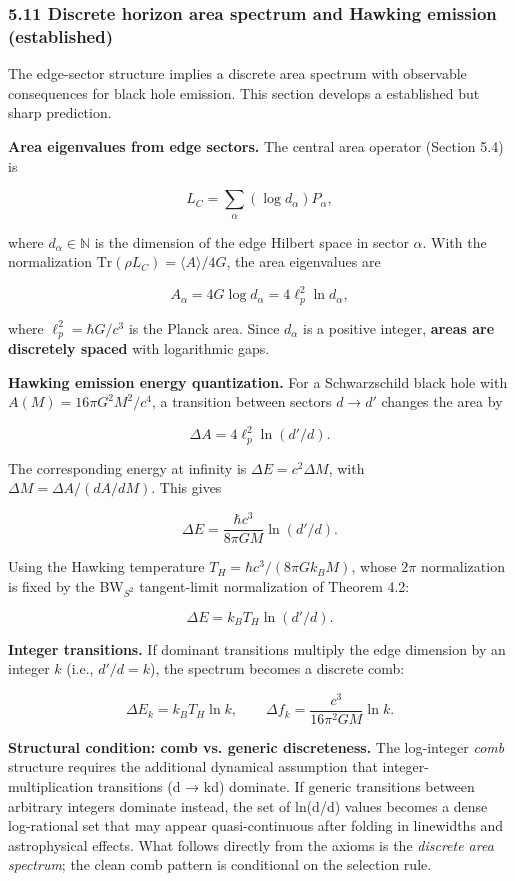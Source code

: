 \subsubsection{5.11 Discrete horizon area spectrum and Hawking emission (established)}\label{511-discrete-horizon-area-spectrum-and-hawking-emission-established}

The edge-sector structure implies a discrete area spectrum with observable consequences for black hole emission. This section develops a established but sharp prediction.

\textbf{Area eigenvalues from edge sectors.} The central area operator (Section 5.4) is

\[
L_C = \sum_\alpha (\log d_\alpha) P_\alpha,
\]

where \(d_\alpha \in \mathbb{N}\) is the dimension of the edge Hilbert space in sector \(\alpha\). With the normalization \(\mathrm{Tr}(\rho L_C) = \langle A
\rangle / 4G\), the area eigenvalues are

\[
A_\alpha = 4G \log d_\alpha = 4\ell_p^2 \ln d_\alpha,
\]

where \(\ell_p^2 = \hbar G/c^3\) is the Planck area. Since \(d_\alpha\) is a positive integer, \textbf{areas are discretely spaced} with logarithmic gaps.

\textbf{Hawking emission energy quantization.} For a Schwarzschild black hole with \(A(M) = 16\pi G^2 M^2/c^4\), a transition between sectors \(d \to d'\) changes the area by

\[
\Delta A = 4\ell_p^2 \ln(d'/d).
\]

The corresponding energy at infinity is \(\Delta E = c^2 \Delta M\), with \(\Delta M = \Delta A / (dA/dM)\). This gives

\[
\Delta E = \frac{\hbar c^3}{8\pi G M} \ln(d'/d).
\]

Using the Hawking temperature \(T_H = \hbar c^3 / (8\pi G k_B M)\), whose \(2\pi\) normalization is fixed by the BW\(_{S^2}\) tangent-limit normalization of Theorem 4.2:

\[
\Delta E = k_B T_H \ln(d'/d).
\]

\textbf{Integer transitions.} If dominant transitions multiply the edge dimension by an integer \(k\) (i.e., \(d'/d = k\)), the spectrum becomes a discrete comb:

\[
\Delta E_k = k_B T_H \ln k, \qquad
\Delta f_k = \frac{c^3}{16\pi^2 G M} \ln k.
\]

\textbf{Structural condition: comb vs. generic discreteness.} The log-integer \emph{comb} structure requires the additional dynamical assumption that integer-multiplication transitions (d → kd) dominate. If generic transitions between arbitrary integers dominate instead, the set of ln(d\textquotesingle/d) values becomes a dense log-rational set that may appear quasi-continuous after folding in linewidths and astrophysical effects. What follows directly from the axioms is the \emph{discrete area spectrum}; the clean comb pattern is conditional on the selection rule.

